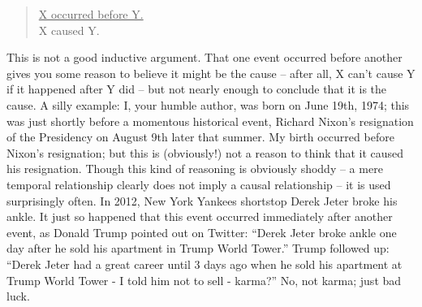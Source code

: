 \begin{quote}\underline{X occurred before Y.} \\
X caused Y.\end{quote}

This is not a good inductive argument. That one event occurred before another gives you some
reason to believe it might be the cause -- after all, X can't cause Y if it happened after Y did -- but
not nearly enough to conclude that it is the cause. A silly example: I, your humble author, was
born on June 19th, 1974; this was just shortly before a momentous historical event, Richard Nixon's
resignation of the Presidency on August 9th later that summer. My birth occurred before Nixon's
resignation; but this is (obviously!) not a reason to think that it caused his resignation.
Though this kind of reasoning is obviously shoddy -- a mere temporal relationship clearly does not
imply a causal relationship -- it is used surprisingly often. In 2012, New York Yankees shortstop
Derek Jeter broke his ankle. It just so happened that this event occurred immediately after another
event, as Donald Trump pointed out on Twitter: ``Derek Jeter broke ankle one day after he sold his
apartment in Trump World Tower.'' Trump followed up: ``Derek Jeter had a great career until 3
days ago when he sold his apartment at Trump World Tower - I told him not to sell - karma?'' 
No, not karma; just bad luck.

